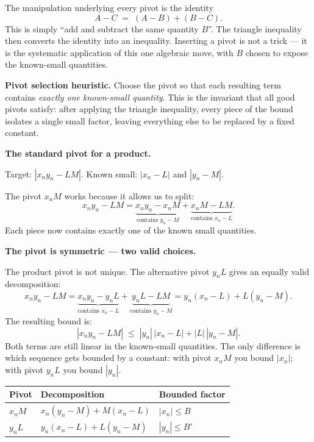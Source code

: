 \medskip

\begin{tcolorbox}[colback=gray!6, colframe=gray!40, arc=2pt,
  left=8pt, right=8pt, top=6pt, bottom=6pt,
  title={\small\textbf{The Algebraic Skeleton}},
  fonttitle=\small\bfseries]
The manipulation underlying every pivot is the identity
\[
  A - C \;=\; (A - B) + (B - C).
\]
This is simply ``add and subtract the same quantity $B$''.
The triangle inequality then converts the identity into an inequality.
Inserting a pivot is not a trick — it is the systematic application
of this one algebraic move, with $B$ chosen to expose the known-small
quantities.
\end{tcolorbox}

\medskip

\noindent\textbf{Pivot selection heuristic.}
Choose the pivot so that each resulting term contains
\emph{exactly one known-small quantity}.
This is the invariant that all good pivots satisfy:
after applying the triangle inequality, every piece of the bound
isolates a single small factor, leaving everything else to be
replaced by a fixed constant.

\medskip

\noindent\textbf{The standard pivot for a product.}

Target: $|x_n y_n - LM|$.
Known small: $|x_n - L|$ and $|y_n - M|$.

The pivot $x_n M$ works because it allows us to split:
\[
  x_n y_n - LM
  = \underbrace{x_n y_n - x_n M}_{\text{contains }y_n - M}
  + \underbrace{x_n M - LM}_{\text{contains }x_n - L}.
\]
Each piece now contains exactly one of the known small quantities.

\medskip

\noindent\textbf{The pivot is symmetric — two valid choices.}

The product pivot is not unique.
The alternative pivot $y_n L$ gives an equally valid decomposition:
\[
  x_n y_n - LM
  = \underbrace{x_n y_n - y_n L}_{\text{contains }x_n - L}
  + \underbrace{y_n L - LM}_{\text{contains }y_n - M}
  = y_n(x_n - L) + L(y_n - M).
\]
The resulting bound is:
\[
  |x_n y_n - LM| \;\le\; |y_n|\,|x_n - L| + |L|\,|y_n - M|.
\]
Both terms are still linear in the known-small quantities.
The only difference is which sequence gets bounded by a constant:
with pivot $x_n M$ you bound $|x_n|$; with pivot $y_n L$ you bound
$|y_n|$.

\begin{center}
\renewcommand{\arraystretch}{1.4}
\begin{tabular}{l l l}
\toprule
\textbf{Pivot} & \textbf{Decomposition} & \textbf{Bounded factor} \\
\midrule
$x_n M$ & $x_n(y_n - M) + M(x_n - L)$ & $|x_n| \le B$ \\
$y_n L$ & $y_n(x_n - L) + L(y_n - M)$ & $|y_n| \le B'$ \\
\bottomrule
\end{tabular}
\end{center}

